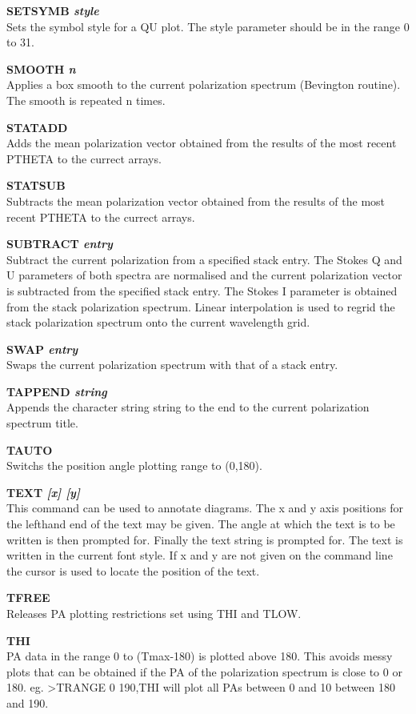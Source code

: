 {\bf SETSYMB \it  style} \\
Sets the symbol style for a QU plot. The style parameter should be in the
range 0 to 31.

{\bf SMOOTH  \it n} \\
Applies a box smooth to the current polarization spectrum (Bevington
routine). The smooth is repeated n times.

{\bf STATADD} \\
Adds the mean polarization vector obtained from the results of the most recent
PTHETA to the currect arrays.

{\bf STATSUB} \\
Subtracts the mean polarization vector obtained from the results of
the most recent PTHETA to the currect arrays.

{\bf SUBTRACT \it  entry } \\
Subtract the current polarization from a specified stack entry. The Stokes Q
and U parameters of both spectra are normalised and the current polarization
vector is subtracted from the specified stack entry. The Stokes I parameter
is obtained from the stack polarization spectrum. Linear interpolation is used
to regrid the stack polarization spectrum onto the current wavelength grid.

{\bf SWAP \it  entry} \\
Swaps the current polarization spectrum with that of a stack entry.

{\bf TAPPEND \it string} \\
Appends the character string string to the end to the current polarization
spectrum title.

{\bf TAUTO} \\
Switchs the position angle plotting range to (0,180).

{\bf TEXT \it  [x] [y]} \\
This command can be used to annotate diagrams. The x and y axis positions for
the lefthand end of the text may be given. The angle at which the text is
to be written is then prompted for. Finally the text string is prompted for.
The text is written in the current font style. If x and y are not given on
the command line the cursor is used to locate the position of the text.

{\bf TFREE} \\
Releases PA plotting restrictions set using THI and TLOW.

{\bf THI} \\
PA data in the range 0 to (Tmax-180) is plotted above 180. This avoids messy
plots that can be obtained if the PA of the polarization spectrum is close
to 0 or 180. eg. >TRANGE 0 190,THI will plot all PAs between 0 and 10 between
180 and 190.


